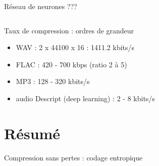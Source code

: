 \documentclass[9pt, aspectratio=169]{beamer}
\begin{document}
\begin{frame}{Réseau de neurones ???} %
\begin{columns}
   \begin{column}{0.48\textwidth}
   \end{column}
   \begin{column}{0.48\textwidth}
   \end{column}
\end{columns}
\end{frame}

\begin{frame}{Taux de compression : ordres de grandeur} %

\begin{itemize}
    \item WAV : 2 x 44100 x 16 : 1411.2 kbits/s
    \item FLAC : 420 - 700 kbps (ratio 2 à 5)
    \item MP3 : 128 - 320 kbits/s
    \item audio Descript (deep learning) : 2 - 8 kbits/s
\end{itemize}

\end{frame}

\section{Résumé}

\begin{frame}{} %
\begin{center}
\Huge \insertsection
\end{center}
\end{frame}

\begin{frame}{Compression sans pertes : codage entropique} %
\begin{columns}
   \begin{column}{0.48\textwidth}
   \end{column}
   \begin{column}{0.48\textwidth}
   \end{column}
\end{columns}
\end{frame}
\end{document}
